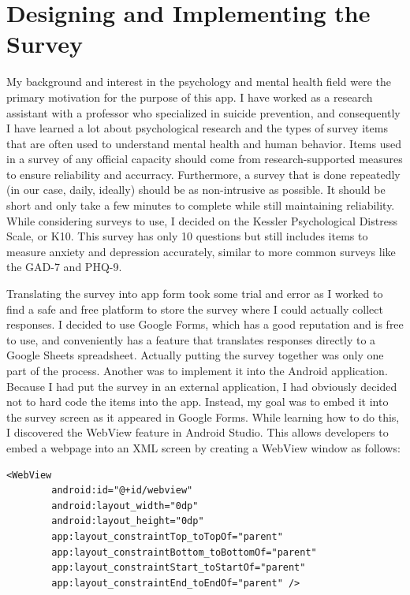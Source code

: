 \documentclass{article}
\begin{document}
\section{Designing and Implementing the Survey}

My background and interest in the psychology and mental health field were the primary motivation for the purpose of this app. I have worked as a research assistant with a professor who specialized in suicide prevention, and consequently I have learned a lot about psychological research and the types of survey items that are often used to understand mental health and human behavior. Items used in a survey of any official capacity should come from research-supported measures to ensure reliability and accurracy. Furthermore, a survey that is done repeatedly (in our case, daily, ideally) should be as non-intrusive as possible. It should be short and only take a few minutes to complete while still maintaining reliability. While considering surveys to use, I decided on the Kessler Psychological Distress Scale, or K10\cite{K10}. This survey has only 10 questions but still includes items to measure anxiety and depression accurately, similar to more common surveys like the GAD-7 and PHQ-9.

Translating the survey into app form took some trial and error as I worked to find a safe and free platform to store the survey where I could actually collect responses. I decided to use Google Forms, which has a good reputation and is free to use, and conveniently has a feature that translates responses directly to a Google Sheets spreadsheet. Actually putting the survey together was only one part of the process. Another was to implement it into the Android application. Because I had put the survey in an external application, I had obviously decided not to hard code the items into the app. Instead, my goal was to embed it into the survey screen as it appeared in Google Forms. While learning how to do this, I discovered the WebView feature in Android Studio\cite{Webview}. This allows developers to embed a webpage into an XML screen by creating a WebView window as follows:

\begin{lstlisting}
<WebView
        android:id="@+id/webview"
        android:layout_width="0dp"
        android:layout_height="0dp"
        app:layout_constraintTop_toTopOf="parent"
        app:layout_constraintBottom_toBottomOf="parent"
        app:layout_constraintStart_toStartOf="parent"
        app:layout_constraintEnd_toEndOf="parent" />
\end{lstlisting}
\end{document}
